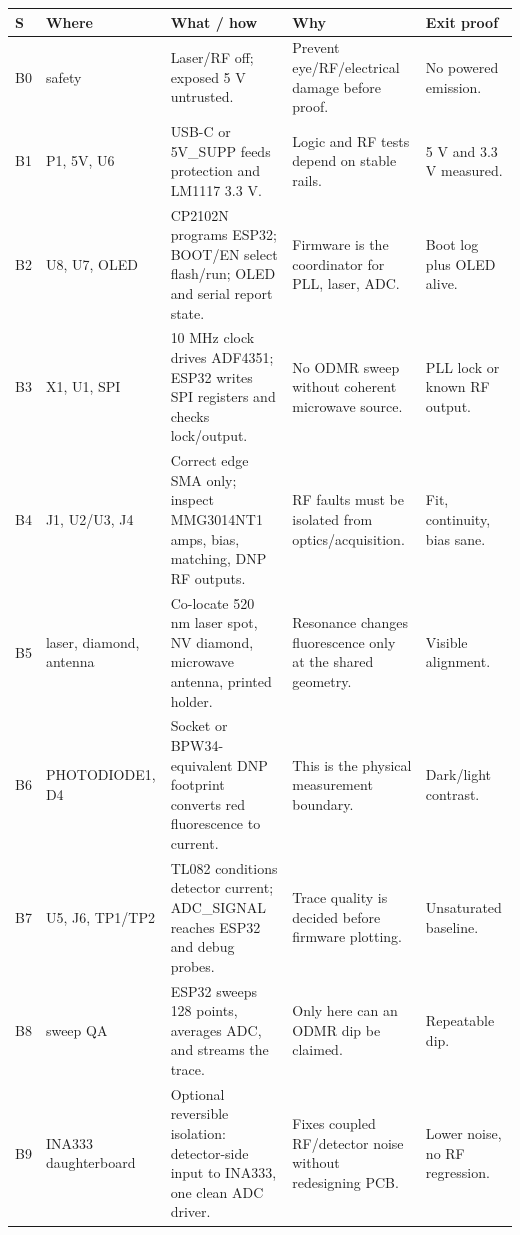 \documentclass[10pt]{article}
\begin{document}
\begin{center}\scriptsize
\begin{tabular}{|L{0.35in}|L{0.9in}|L{1.75in}|L{1.65in}|L{1.35in}|}
\hline
\textbf{S} & \textbf{Where} & \textbf{What / how} & \textbf{Why} & \textbf{Exit proof} \\
\hline
B0 & safety & Laser/RF off; exposed 5 V untrusted. & Prevent eye/RF/electrical damage before proof. & No powered emission. \\
\hline
B1 & P1, 5V, U6 & USB-C or 5V\_SUPP feeds protection and LM1117 3.3 V. & Logic and RF tests depend on stable rails. & 5 V and 3.3 V measured. \\
\hline
B2 & U8, U7, OLED & CP2102N programs ESP32; BOOT/EN select flash/run; OLED and serial report state. & Firmware is the coordinator for PLL, laser, ADC. & Boot log plus OLED alive. \\
\hline
B3 & X1, U1, SPI & 10 MHz clock drives ADF4351; ESP32 writes SPI registers and checks lock/output. & No ODMR sweep without coherent microwave source. & PLL lock or known RF output. \\
\hline
B4 & J1, U2/U3, J4 & Correct edge SMA only; inspect MMG3014NT1 amps, bias, matching, DNP RF outputs. & RF faults must be isolated from optics/acquisition. & Fit, continuity, bias sane. \\
\hline
B5 & laser, diamond, antenna & Co-locate 520 nm laser spot, NV diamond, microwave antenna, printed holder. & Resonance changes fluorescence only at the shared geometry. & Visible alignment. \\
\hline
B6 & PHOTODIODE1, D4 & Socket or BPW34-equivalent DNP footprint converts red fluorescence to current. & This is the physical measurement boundary. & Dark/light contrast. \\
\hline
B7 & U5, J6, TP1/TP2 & TL082 conditions detector current; ADC\_SIGNAL reaches ESP32 and debug probes. & Trace quality is decided before firmware plotting. & Unsaturated baseline. \\
\hline
B8 & sweep QA & ESP32 sweeps 128 points, averages ADC, and streams the trace. & Only here can an ODMR dip be claimed. & Repeatable dip. \\
\hline
B9 & INA333 daughterboard & Optional reversible isolation: detector-side input to INA333, one clean ADC driver. & Fixes coupled RF/detector noise without redesigning PCB. & Lower noise, no RF regression. \\
\hline
\end{tabular}
\end{center}
\end{document}
